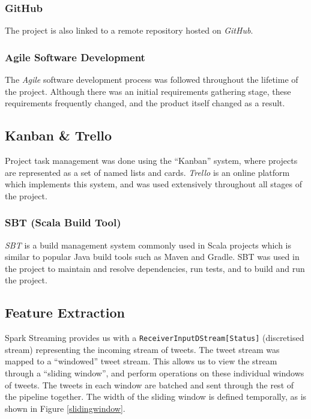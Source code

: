 \documentclass{l4proj}
\newcommand{\code}[1]{\texttt{#1}}
\begin{document}
             \subsubsection{GitHub}
             The project is also linked to a remote repository hosted on \textit{GitHub}.
             
             \subsubsection{Agile Software Development}
             The \textit{Agile} software development process was followed throughout the lifetime of the project. Although there was an initial requirements gathering stage, these requirements frequently changed, and the product itself changed as a result.
             
             \subsection{Kanban \& Trello}
             Project task management was done using the ``Kanban'' system, where projects are represented as a set of named lists and cards. \textit{Trello} is an online platform which implements this system, and was used extensively throughout all stages of the project.
         
             \subsubsection{SBT (Scala Build Tool)}
         \textit{SBT} is a build management system commonly used in Scala projects which is similar to popular Java build tools such as Maven and Gradle. SBT was used in the project to maintain and resolve dependencies, run tests, and to build and run the project.

    
    
    \subsection{Feature Extraction}
        
        Spark Streaming provides us with a \code{ReceiverInputDStream[Status]} (discretised stream) representing the incoming stream of tweets. The tweet stream was mapped to a ``windowed'' tweet stream. This allows us to view the stream through a ``sliding window'', and perform operations on these individual windows of tweets. The tweets in each window are batched and sent through the rest of the pipeline together. The width of the sliding window is defined temporally, as is shown in Figure \ref{slidingwindow}.
        
\end{document}
